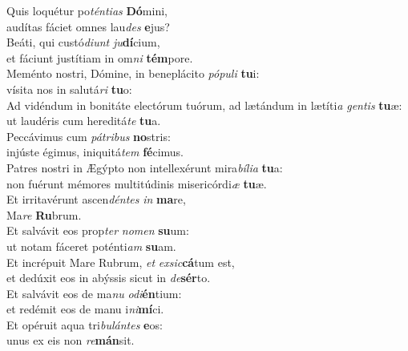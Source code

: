 \evenverse Quis loquétur po\textit{tén}\textit{ti}\textit{as} \textbf{Dó}mini,~\*\\
\evenverse audítas fáciet omnes lau\textit{des} \textbf{e}jus?\\
\oddverse Beáti, qui custó\textit{di}\textit{unt} \textit{ju}\textbf{dí}cium,~\*\\
\oddverse et fáciunt justítiam in om\textit{ni} \textbf{tém}pore.\\
\evenverse Meménto nostri, Dómine, in beneplácito \textit{pó}\textit{pu}\textit{li} \textbf{tu}i:~\*\\
\evenverse vísita nos in salutá\textit{ri} \textbf{tu}o:\\
\oddverse Ad vidéndum in bonitáte electórum tuórum, ad lætándum in lætíti\textit{a} \textit{gen}\textit{tis} \textbf{tu}æ:~\*\\
\oddverse ut laudéris cum hereditá\textit{te} \textbf{tu}a.\\
\evenverse Peccávimus cum \textit{pá}\textit{tri}\textit{bus} \textbf{no}stris:~\*\\
\evenverse injúste égimus, iniquitá\textit{tem} \textbf{fé}cimus.\\
\oddverse Patres nostri in Ægýpto non intellexérunt mira\textit{bí}\textit{li}\textit{a} \textbf{tu}a:~\*\\
\oddverse non fuérunt mémores multitúdinis misericórdi\textit{æ} \textbf{tu}æ.\\
\evenverse Et irritavérunt ascen\textit{dén}\textit{tes} \textit{in} \textbf{ma}re,~\*\\
\evenverse Ma\textit{re} \textbf{Ru}brum.\\
\oddverse Et salvávit eos prop\textit{ter} \textit{no}\textit{men} \textbf{su}um:~\*\\
\oddverse ut notam fáceret poténti\textit{am} \textbf{su}am.\\
\evenverse Et incrépuit Mare Rubrum, \textit{et} \textit{ex}\textit{sic}\textbf{cá}tum est,~\*\\
\evenverse et dedúxit eos in abýssis sicut in \textit{de}\textbf{sér}to.\\
\oddverse Et salvávit eos de ma\textit{nu} \textit{o}\textit{di}\textbf{én}tium:~\*\\
\oddverse et redémit eos de manu i\textit{ni}\textbf{mí}ci.\\
\evenverse Et opéruit aqua tri\textit{bu}\textit{lán}\textit{tes} \textbf{e}os:~\*\\
\evenverse unus ex eis non \textit{re}\textbf{mán}sit.\\
